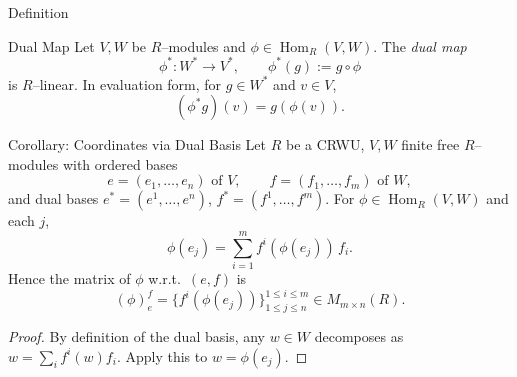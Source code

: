 \begin{frame}{Definition}
\begin{block}{Dual Map}
Let $V,W$ be $R$–modules and $\phi\in\operatorname{Hom}_R(V,W)$. The \emph{dual map}
\[
\phi^*:W^*\longrightarrow V^*,\qquad \phi^*(g):=g\circ \phi
\]
is $R$–linear. In evaluation form, for $g\in W^*$ and $v\in V$,
\[
(\phi^* g)(v) = g\left(\phi(v)\right).
\]
\end{block}


\begin{center}
\end{center}
\end{frame}

\begin{frame}{Corollary: Coordinates via Dual Basis}
Let $R$ be a CRWU, $V,W$ finite free $R$–modules with ordered bases
\[
e=(e_1,\dots,e_n)\text{ of }V,\qquad f=(f_1,\dots,f_m)\text{ of }W,
\]
and dual bases $e^*=(e^1,\dots,e^n)$, $f^*=(f^1,\dots,f^m)$. For $\phi\in\operatorname{Hom}_R(V,W)$ and each $j$,
\[
\phi(e_j)=\sum_{i=1}^m f^i(\phi(e_j))\, f_i.
\]
Hence the matrix of $\phi$ w.r.t.\ $(e,f)$ is
\[
(\phi)_e^f=\big\{f^i(\phi(e_j))\big\}_{1\le j\le n}^{1\le i\le m}\in M_{m\times n}(R).
\]
\vspace{-0.2cm}
\begin{proof}
By definition of the dual basis, any $w\in W$ decomposes as $w=\sum_i f^i(w)f_i$. Apply this to $w=\phi(e_j)$.
\end{proof}
\end{frame}





